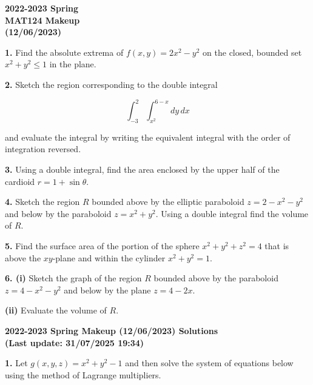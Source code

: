\documentclass{article}
\begin{document}
\pagestyle{empty}
\large

\begin{center}
\textbf{2022-2023 Spring \\MAT124 Makeup\\(12/06/2023)}
\end{center}

\textbf{1.} Find the absolute extrema of $f(x,y) = 2x^2-y^2$ on the closed, bounded set $x^2+y^2\leq1$ in the plane.

\vspace{1em}

\textbf{2.} Sketch the region corresponding to the double integral

\[\int_{-3}^2\int_{x^2}^{6-x}dy\,dx\]

and evaluate the integral by writing the equivalent integral with the order of integration reversed.

\vspace{1em}

\textbf{3.} Using a double integral, find the area enclosed by the upper half of the cardioid $r=1+\sin\theta$.

\vspace{1em}

\textbf{4.} Sketch the region $R$ bounded above by the elliptic paraboloid $z=2-x^2-y^2$ and below by the paraboloid $z=x^2+y^2$. Using a double integral find the volume of $R$.

\vspace{1em}

\textbf{5.} Find the surface area of the portion of the sphere $x^2+y^2+z^2=4$ that is above the $xy$-plane and within the cylinder $x^2+y^2=1$.

\vspace{1em}

\textbf{6. (i)} Sketch the graph of the region $R$ bounded above by the paraboloid $z=4-x^2-y^2$ and below by the plane $z=4-2x$.

\textbf{(ii)} Evaluate the volume of $R$.

\newpage

\begin{center}
\textbf{2022-2023 Spring Makeup (12/06/2023) Solutions\\
(Last update: 31/07/2025 19:34)}
\end{center}

\textbf{1.} Let $g(x,y,z)=x^2+y^2-1$ and then solve the system of equations below using the method of Lagrange multipliers.
\end{document}
